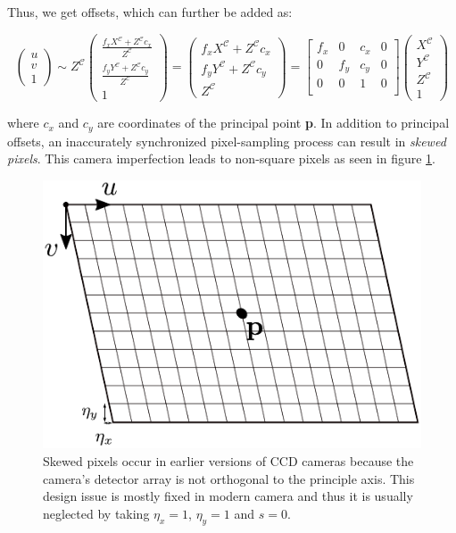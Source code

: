 \documentclass[a4paper]{report}
\numberwithin{figure}{section}
\begin{document}
Thus, we get offsets, which can further be added as:

\begin{equation}
  \begin{pmatrix}
    u\\
    v\\
    1
  \end{pmatrix}
  \sim
  Z^{\mathcal{C}}
  \begin{pmatrix}
    \frac{f_x X^{\mathcal{C}} + Z^{\mathcal{C}} c_x}{Z^{\mathcal{C}}}\\
    \frac{f_y Y^{\mathcal{C}} + Z^{\mathcal{C}} c_y}{Z^{\mathcal{C}}}\\
    1
  \end{pmatrix}
  =
  \begin{pmatrix}
    f_xX^{\mathcal{C}} + Z^{\mathcal{C}} c_x\\
    f_yY^{\mathcal{C}} + Z^{\mathcal{C}} c_y\\
    Z^{\mathcal{C}}
  \end{pmatrix}
  =
  \begin{bmatrix}
    f_x & 0 & c_x & 0\\
    0 & f_y & c_y & 0\\
    0 & 0 & 1 & 0\\
  \end{bmatrix}
  \begin{pmatrix}
    X^{\mathcal{C}}\\
    Y^{\mathcal{C}}\\
    Z^{\mathcal{C}}\\
    1
  \end{pmatrix}\label{eq:proj_func_w_f_c}
\end{equation} 

where $c_x$ and $c_y$ are coordinates of the principal point \textbf{p}.
In addition to principal offsets, an inaccurately synchronized pixel-sampling 
process can result in \textit{skewed pixels}. This camera imperfection leads 
to non-square pixels as seen in figure \ref{fig:skewed}.

\begin{figure}[H]
	\centering
  \includegraphics[width=0.4\linewidth,natwidth=640,natheight=640]
  {fig/drawings/pinhole_skew.pdf}
  \caption[Skewed Pixels]{Skewed pixels occur in earlier versions of CCD 
  cameras because the camera's detector array is not orthogonal to the 
  principle axis. This design issue is mostly fixed in modern camera and thus 
  it is usually neglected by taking $\eta_x=1$, $\eta_y=1$ and $s=0$.}
	\label{fig:skewed}
\end{figure}
\end{document}
